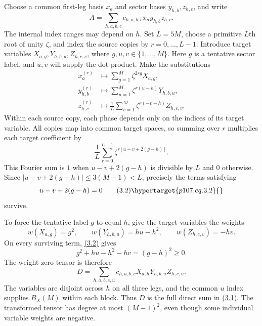 \begin{amsthmproof}
Choose a common first-leg basis $x_a$ and sector bases $y_{h,b},z_{h,c}$, and write
\[A=\sum_{h,a,b,c}c_{h,a,b,c}x_a y_{h,b}z_{h,c}.\]
The internal index ranges may depend on $h$. Set $L=5M$, choose a primitive $L$th root of unity $\zeta$, and index the source copies by $r=0,\ldots,L-1$. Introduce target variables $X_{a,g},Y_{h,b,u},Z_{h,c,v}$, where $g,u,v\in\{1,\ldots,M\}$. Here $g$ is a tentative sector label, and $u,v$ will supply the dot product. Make the substitutions
\[
\begin{aligned}
x_a^{(r)}&\longmapsto\sum_{g=1}^M\zeta^{2rg}X_{a,g},\\
y_{h,b}^{(r)}&\longmapsto\sum_{u=1}^M\zeta^{r(u-h)}Y_{h,b,u},\\
z_{h,c}^{(r)}&\longmapsto\frac1L\sum_{v=1}^M\zeta^{r(-v-h)}Z_{h,c,v}.
\end{aligned}
\]
Within each source copy, each phase depends only on the indices of its target variable. All copies map into common target spaces, so summing over $r$ multiplies each target coefficient by
\[\frac1L\sum_{r=0}^{L-1}\zeta^{r[u-v+2(g-h)]}.\]
This Fourier sum is $1$ when $u-v+2(g-h)$ is divisible by $L$ and $0$ otherwise. Since $|u-v+2(g-h)|\le3(M-1)<L$, precisely the terms satisfying
\begin{equation}u-v+2(g-h)=0\tag{3.2}\hypertarget{p107.eq.3.2}{}\end{equation}
survive.

To force the tentative label $g$ to equal $h$, give the target variables the weights
\[w(X_{a,g})=g^2,\qquad w(Y_{h,b,u})=hu-h^2,\qquad w(Z_{h,c,v})=-hv.\]
On every surviving term, \hyperlink{p107.eq.3.2}{(3.2)} gives
\[g^2+hu-h^2-hv=(g-h)^2\ge0.\]
The weight-zero tensor is therefore
\[D=\sum_{h,a,b,c,u}c_{h,a,b,c}X_{a,h}Y_{h,b,u}Z_{h,c,u}.\]
The variables are disjoint across $h$ on all three legs, and the common $u$ index supplies $B_X(M)$ within each block. Thus $D$ is the full direct sum in \hyperlink{p107.eq.3.1}{(3.1)}. The transformed tensor has degree at most $(M-1)^2$, even though some individual variable weights are negative.
\end{amsthmproof}

